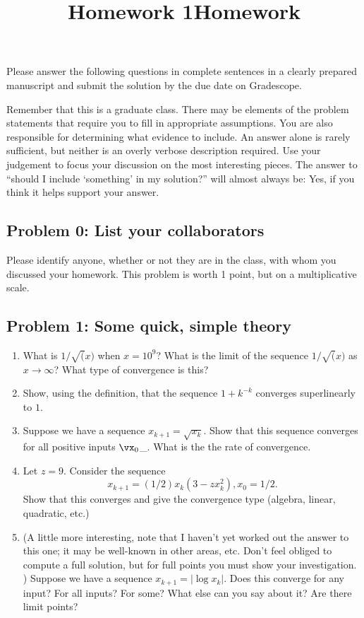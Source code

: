 \documentclass[]{article}
\title{Homework 1}
\title{Homework}
\begin{document}
\maketitle

Please answer the following questions in complete sentences in a clearly
prepared manuscript and submit the solution by the due date on
Gradescope.

Remember that this is a graduate class. There may be elements of the
problem statements that require you to fill in appropriate assumptions.
You are also responsible for determining what evidence to include. An
answer alone is rarely sufficient, but neither is an overly verbose
description required. Use your judgement to focus your discussion on the
most interesting pieces. The answer to ``should I include `something' in
my solution?'' will almost always be: Yes, if you think it helps support
your answer.

\hypertarget{problem-0-list-your-collaborators}{%
\subsection{Problem 0: List your
collaborators}\label{problem-0-list-your-collaborators}}

Please identify anyone, whether or not they are in the class, with whom
you discussed your homework. This problem is worth 1 point, but on a
multiplicative scale.

\hypertarget{problem-1-some-quick-simple-theory}{%
\subsection{Problem 1: Some quick, simple
theory}\label{problem-1-some-quick-simple-theory}}

\begin{enumerate}
\def\labelenumi{\arabic{enumi}.}
\item
  What is \(1/\sqrt(x)\) when \(x = 10^9\)? What is the limit of the
  sequence \(1/\sqrt(x)\) as \(x \to \infty\)? What type of convergence
  is this?
\item
  Show, using the definition, that the sequence \(1 + k^{-k}\) converges
  superlinearly to \(1\).
\item
  Suppose we have a sequence \(x_{k+1} = \sqrt{x_k}\). Show that this
  sequence converges for all positive inputs \(\vx_0\)\_. What is the
  the rate of convergence.
\item
  Let \(z = 9\). Consider the sequence
  \[ x_{k+1} = (1/2)  x_k (3 - z x_k^2), x_0 = 1/2. \] Show that this
  converges and give the convergence type (algebra, linear, quadratic,
  etc.)
\item
  (A little more interesting, note that I haven't yet worked out the
  answer to this one; it may be well-known in other areas, etc. Don't
  feel obliged to compute a full solution, but for full points you must
  show your investigation. ) Suppose we have a sequence
  \(x_{k+1} = |\log{x_k}|\). Does this converge for any input? For all
  inputs? For some? What else can you say about it? Are there limit
  points?
\end{enumerate}
\end{document}
